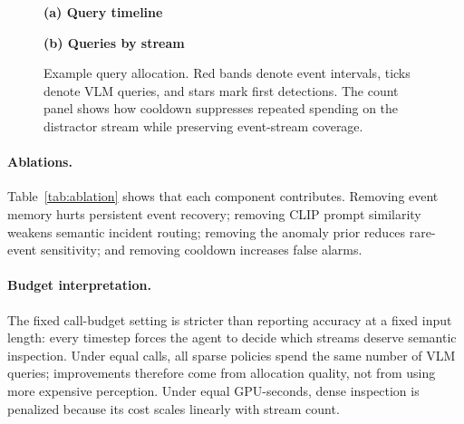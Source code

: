 \begin{figure}[t]
\centering
\begin{minipage}{0.66\linewidth}
\centering
{\scriptsize\textbf{(a) Query timeline}}\\[-0.3em]
\resizebox{\linewidth}{!}{}
\end{minipage}\hfill
\begin{minipage}{0.30\linewidth}
\centering
{\scriptsize\textbf{(b) Queries by stream}}\\[-0.3em]

\end{minipage}
\caption{Example query allocation. Red bands denote event intervals, ticks denote VLM queries, and stars mark first \method{} detections. The count panel shows how cooldown suppresses repeated spending on the distractor stream while preserving event-stream coverage.}
\label{fig:timeline}
\end{figure}

\paragraph{Ablations.}
Table~\ref{tab:ablation} shows that each component contributes. Removing event memory hurts persistent event recovery; removing CLIP prompt similarity weakens semantic incident routing; removing the anomaly prior reduces rare-event sensitivity; and removing cooldown increases false alarms.

\begin{table}[t]
\centering
\caption{Ablation at the same VLM-call budget.}
\label{tab:ablation}

\end{table}

\paragraph{Budget interpretation.}
The fixed call-budget setting is stricter than reporting accuracy at a fixed input length: every timestep forces the agent to decide which streams deserve semantic inspection. Under equal calls, all sparse policies spend the same number of VLM queries; improvements therefore come from allocation quality, not from using more expensive perception. Under equal GPU-seconds, dense inspection is penalized because its cost scales linearly with stream count.
